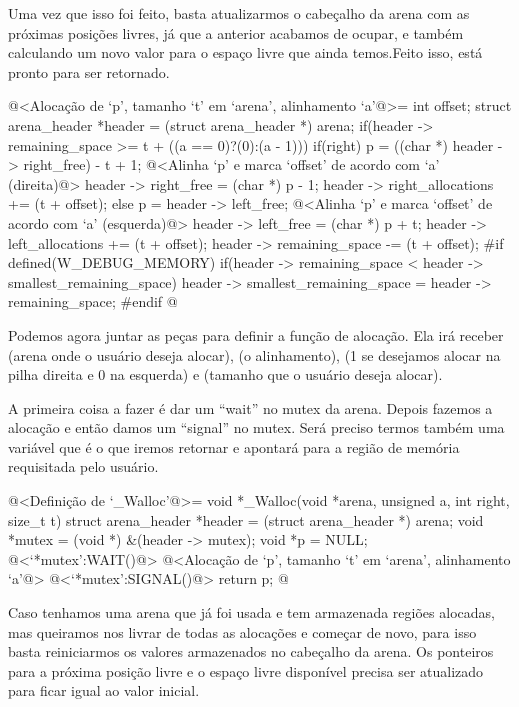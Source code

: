 Uma vez que isso foi feito, basta atualizarmos o cabeçalho da arena
com as próximas posições livres, já que a anterior acabamos de ocupar,
e também calculando um novo valor para o espaço livre que ainda
temos.Feito isso,
 está pronto para ser retornado.

\iniciocodigo
@<Alocação de `p', tamanho `t' em `arena', alinhamento `a'@>=
{
  int offset;
  struct arena_header *header = (struct arena_header *) arena;
  if(header -> remaining_space >= t + ((a == 0)?(0):(a - 1))){
    if(right){
      p = ((char *) header -> right_free) - t + 1;
      @<Alinha `p' e marca `offset' de acordo com `a' (direita)@>
      header -> right_free = (char *) p - 1;
      header -> right_allocations += (t + offset);
    }
    else{
      p = header -> left_free;
      @<Alinha `p' e marca `offset' de acordo com `a' (esquerda)@>
      header -> left_free = (char *) p + t;
      header -> left_allocations += (t + offset);
    }
    header -> remaining_space -= (t + offset);
#if defined(W_DEBUG_MEMORY)
    if(header -> remaining_space < header -> smallest_remaining_space)
      header -> smallest_remaining_space = header -> remaining_space;
#endif
  }
}
@
\fimcodigo


Podemos agora juntar as peças para definir a função de alocação. Ela
irá receber  (arena onde o usuário deseja alocar),
 (o alinhamento),  (1 se desejamos
alocar na pilha direita e 0 na esquerda) e  (tamanho que
o usuário deseja alocar).

A primeira coisa a fazer é dar um ``wait'' no mutex da arena. Depois
fazemos a alocação e então damos um ``signal'' no mutex. Será preciso
termos também uma variável  que é o que iremos retornar
e apontará para a região de memória requisitada pelo usuário.


\iniciocodigo
@<Definição de `\_Walloc'@>=
void *_Walloc(void *arena, unsigned a, int right, size_t t){
  struct arena_header *header = (struct arena_header *) arena;
  void *mutex = (void *) &(header -> mutex);
  void *p = NULL;
  @<`*mutex':WAIT()@>
  @<Alocação de `p', tamanho `t' em `arena', alinhamento `a'@>
  @<`*mutex':SIGNAL()@>
  return p;
}
@
\fimcodigo


Caso tenhamos uma arena que já foi usada e tem armazenada regiões
alocadas, mas queiramos nos livrar de todas as alocações e começar de
novo, para isso basta reiniciarmos os valores armazenados no cabeçalho
da arena. Os ponteiros para a próxima posição livre e o espaço livre
disponível precisa ser atualizado para ficar igual ao valor inicial.

